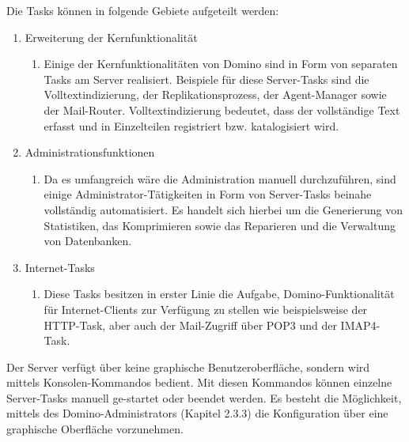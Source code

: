 \begin{flushleft}
Die Tasks können in folgende Gebiete aufgeteilt werden:
\end{flushleft}

\begin{enumerate}
\item Erweiterung der Kernfunktionalität
\begin{enumerate}
\item Einige der Kernfunktionalitäten von Domino sind in Form von separaten Tasks am Server realisiert. Beispiele für diese Server-Tasks sind die
		 Volltextindizierung, der \linebreak Replikationsprozess, der Agent-Manager sowie der Mail-Router. \linebreak Volltextindizierung bedeutet, dass der
		  vollständige Text 
		  erfasst und in Einzelteilen registriert bzw. katalogisiert wird.
\end{enumerate}
\item Administrationsfunktionen
\begin{enumerate}
\item Da es umfangreich wäre die Administration manuell durchzuführen, sind einige Administrator-Tätigkeiten in Form von Server-Tasks
	beinahe vollständig \linebreak automatisiert. Es handelt sich hierbei um die Generierung von Statistiken, das \linebreak
	Komprimieren sowie
	 das Reparieren und die Verwaltung von Datenbanken.
\end{enumerate}
\item Internet-Tasks
\begin{enumerate}
\item Diese Tasks besitzen in erster Linie die Aufgabe, Domino-Funktionalität für Internet-Clients zur Verfügung zu stellen wie beispielsweise der HTTP-Task,
	aber auch der Mail-Zugriff über POP3 und der IMAP4-Task.
\end{enumerate}
\end{enumerate}


Der Server verfügt über keine graphische Benutzeroberfläche, sondern wird mittels Konsolen-Kommandos bedient. Mit diesen Kommandos können
 einzelne Server-Tasks manuell ge-\linebreak startet oder beendet werden\cite{knaepper}. Es besteht die Möglichkeit, mittels des Domino-Administrators \linebreak
(Kapitel 2.3.3) die Konfiguration über eine graphische Oberfläche vorzunehmen.


